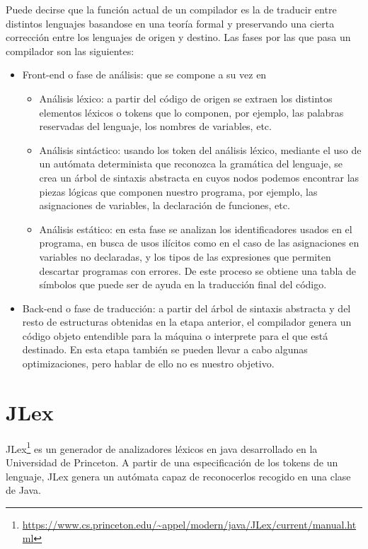 Puede decirse que la función actual de un compilador es la de traducir entre distintos lenguajes basandose en una teoría formal y preservando una cierta corrección entre los lenguajes de origen y destino. Las fases por las que pasa un compilador son las siguientes:
\begin{itemize}
\item Front-end o fase de análisis: que se compone a su vez en
  \begin{itemize}
  \item Análisis léxico: a partir del código de origen se extraen los distintos elementos léxicos o tokens que lo componen, por ejemplo, las palabras reservadas del lenguaje, los nombres de variables, etc.
  \item Análisis sintáctico: usando los token del análisis léxico, mediante el uso de un autómata determinista que reconozca la gramática del lenguaje, se crea un árbol de sintaxis abstracta en cuyos nodos podemos encontrar las piezas lógicas que componen nuestro programa, por ejemplo, las asignaciones de variables, la declaración de funciones, etc.
  \item Análisis estático: en esta fase se analizan los identificadores usados en el programa, en busca de usos ilícitos como en el caso de las asignaciones en variables no declaradas, y los tipos de las expresiones que permiten descartar programas con errores. De este proceso se obtiene una tabla de símbolos que puede ser de ayuda en la traducción final del código.
  \end{itemize}
\item Back-end o fase de traducción: a partir del árbol de sintaxis abstracta y del resto de estructuras obtenidas en la etapa anterior, el compilador genera un código objeto entendible para la máquina o interprete para el que está destinado. En esta etapa también se pueden llevar a cabo algunas optimizaciones, pero hablar de ello no es nuestro objetivo.
\end{itemize}

\section{JLex}

JLex\footnote{\url{https://www.cs.princeton.edu/~appel/modern/java/JLex/current/manual.html}} es un generador de analizadores léxicos en java desarrollado en la Universidad de Princeton. A partir de una especificación de los tokens de un lenguaje, JLex genera un autómata capaz de reconocerlos recogido en una clase de Java.\\

